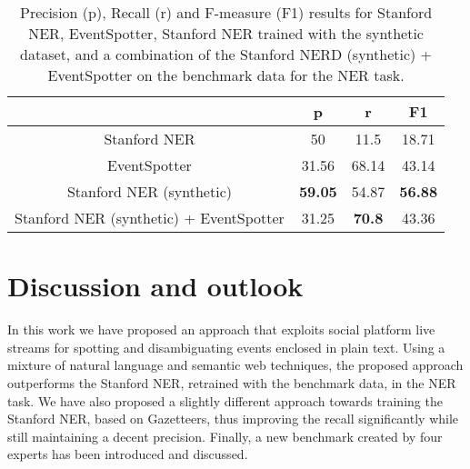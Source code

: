 \documentclass[10pt,a4paper]{article}
\begin{document}
{%
\begin{table}[h]
\centering %
\begin{tabular}{c c c c} %
\hline %
& p & r & F1 \\ [0.5ex] %
\hline\hline %
Stanford NER & 50 & 11.5 & 18.71 \\
EventSpotter & 31.56 & 68.14 & 43.14 \\
\hline
Stanford NER (synthetic) & \textbf{59.05} & 54.87 & \textbf{56.88} \\
Stanford NER (synthetic) + EventSpotter & 31.25 & \textbf{70.8} & 43.36 \\
\hline %
\end{tabular}
\caption{Precision (p), Recall (r) and F-measure (F1) results for Stanford NER, EventSpotter, Stanford NER trained with the synthetic dataset, and a combination of the Stanford NERD (synthetic) + EventSpotter on the benchmark data for the NER task.} %
\label{tab:manual} %
\end{table}

\section{Discussion and outlook}
In this work we have proposed an approach that exploits social platform live streams for spotting and disambiguating events enclosed in plain text. Using a mixture of natural language and semantic web techniques, the proposed approach outperforms the Stanford NER, retrained with the benchmark data, in the NER task. We have also proposed a slightly different approach towards training the Stanford NER, based on Gazetteers, thus improving the recall significantly while still maintaining a decent precision. Finally, a new benchmark created by four experts has been introduced and discussed. 

}
\end{document}
